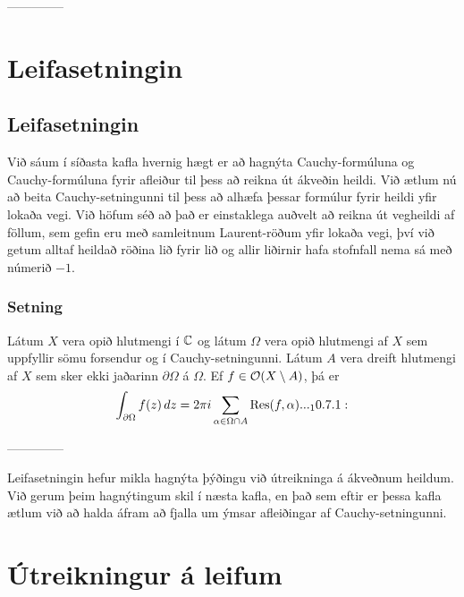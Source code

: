 --------------



\section{Leifasetningin }

\subsection{Leifasetningin }

\noindent
Við sáum í síðasta kafla hvernig hægt er að hagnýta
Cauchy-formúluna  og Cauchy-formúluna fyrir afleiður 
til þess að reikna út ákveðin heildi.  
Við ætlum nú að beita  Cauchy-setningunni til þess að 
alhæfa þessar formúlur fyrir heildi yfir lokaða vegi.
Við höfum séð að það er einstaklega auðvelt að
reikna út vegheildi  af föllum, sem gefin eru með samleitnum
Laurent-röðum yfir lokaða vegi, því við getum alltaf heildað röðina
lið fyrir lið og allir liðirnir hafa stofnfall nema sá með númerið
$-1$.  

\subsubsection{Setning}  
Látum $X$ vera opið hlutmengi í ${\mathbb C}$ og látum $\Omega$ vera opið
hlutmengi af $X$ sem uppfyllir sömu forsendur og í
Cauchy-setningunni.
Látum $A$ vera dreift hlutmengi af $X$ sem sker ekki jaðarinn
$\partial\Omega$ á $\Omega$.  Ef $f\in {\cal O}(X\setminus A)$, þá er
 \begin{equation*}
\int_{\partial\Omega}f(z)\, dz = 2\pi i \sum_{\alpha\in \Omega\cap A}
\Res(f,\alpha).


.. _10.7.1:

 \end{equation*}


--------------



\medskip
Leifasetningin hefur mikla hagnýta þýðingu við útreikninga á ákveðnum
heild\-um.  Við gerum þeim hagnýtingum skil í næsta kafla, en það 
sem eftir er þessa kafla ætlum við að halda áfram að fjalla um ýmsar
afleiðingar af Cauchy-setningunni.




\section{Útreikningur á leifum}


